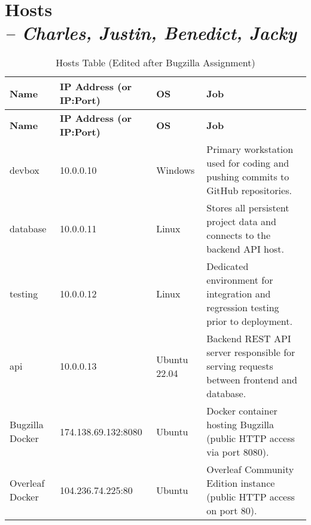 \chapter[Hosts]{Hosts\\\small{\textit{-- Charles, Justin, Benedict, Jacky}}}
\label{Chapter::Hosts}

\begin{longtable}{|p{2.5cm}||p{5cm}||p{2.5cm}||p{6.5cm}|}
\caption{Hosts Table (Edited after Bugzilla Assignment)\label{Table::HostsTable}}\\
\hline
\textbf{Name} & \textbf{IP Address (or IP:Port)} & \textbf{OS} & \textbf{Job} \\
\hline
\endfirsthead
\hline
\textbf{Name} & \textbf{IP Address (or IP:Port)} & \textbf{OS} & \textbf{Job} \\
\hline
\endhead

devbox & 10.0.0.10 & Windows & Primary workstation used for coding and pushing commits to GitHub repositories. \\
\hline

database & 10.0.0.11 & Linux & Stores all persistent project data and connects to the backend API host. \\
\hline

testing & 10.0.0.12 & Linux & Dedicated environment for integration and regression testing prior to deployment. \\
\hline

api & 10.0.0.13 & Ubuntu 22.04 & Backend REST API server responsible for serving requests between frontend and database. \\
\hline

Bugzilla Docker & 174.138.69.132:8080 & Ubuntu & Docker container hosting Bugzilla (public HTTP access via port 8080). \\
\hline

Overleaf Docker & 104.236.74.225:80 & Ubuntu & Overleaf Community Edition instance (public HTTP access on port 80). \\
\hline

\end{longtable}
